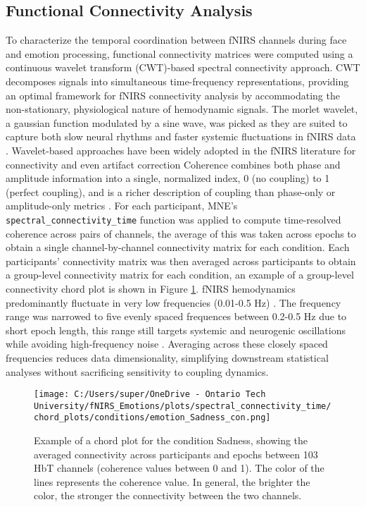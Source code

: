 \subsection{Functional Connectivity Analysis}
\label{sec:fc}
To characterize the temporal coordination between fNIRS channels during face and emotion processing, functional connectivity matrices were computed using a continuous wavelet transform (CWT)-based spectral connectivity approach.
CWT decomposes signals into simultaneous time-frequency representations, providing an optimal framework for fNIRS connectivity analysis by accommodating the non-stationary, physiological nature of hemodynamic signals. 
The morlet wavelet, a gaussian function modulated by a sine wave, was picked as they are suited to capture both slow neural rhythms and faster systemic fluctuations in fNIRS data \citep{reddy_evaluation_2021}. 
Wavelet-based approaches have been widely adopted in the fNIRS literature for connectivity and even artifact correction \citep{bergmann_evaluation_2023, hakim_quantification_2023}
Coherence combines both phase and amplitude information into a single, normalized index, 0 (no coupling) to 1 (perfect coupling), and is a richer description of coupling than phase-only or amplitude-only metrics \citep{bastos_tutorial_2016}.
For each participant, MNE's \texttt{spectral\_connectivity\_time} function was applied to compute time-resolved coherence across pairs of channels, the average of this was taken across epochs to obtain a single channel-by-channel connectivity matrix for each condition.
Each participants' connectivity matrix was then averaged across participants to obtain a group-level connectivity matrix for each condition, an example of a group-level connectivity chord plot is shown in Figure \ref{fig:chord_plot}.
fNIRS hemodynamics predominantly fluctuate in very low frequencies (0.01-0.5 Hz) \citep{reddy_evaluation_2021}. 
The frequency range was narrowed to five evenly spaced frequences between 0.2-0.5 Hz due to short epoch length, this range still targets systemic and neurogenic oscillations while avoiding high-frequency noise \citep{xu_functional_2017}.
Averaging across these closely spaced frequencies reduces data dimensionality, simplifying downstream statistical analyses without sacrificing sensitivity to coupling dynamics. 

\begin{figure}[H]
    \centering
    \texttt{[image: C:/Users/super/OneDrive - Ontario Tech University/fNIRS\_Emotions/plots/spectral\_connectivity\_time/chord\_plots/conditions/emotion\_Sadness\_con.png]}
    \caption[Chord plot for Sadness condition]{Example of a chord plot for the condition Sadness, showing the averaged connectivity across participants and epochs between 103 HbT channels (coherence values between 0 and 1).
    The color of the lines represents the coherence value. 
    In general, the brighter the color, the stronger the connectivity between the two channels.}
    \label{fig:chord_plot}
\end{figure}

